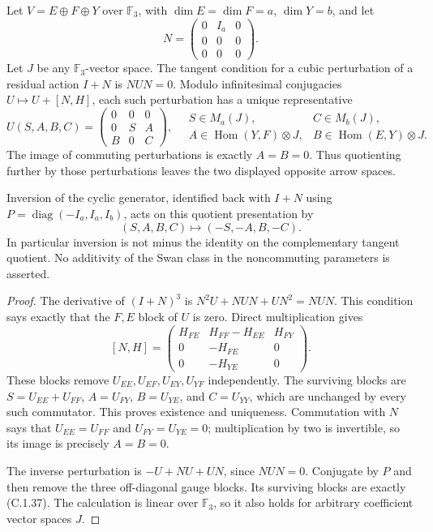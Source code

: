 \begin{lemma}
\label{C:shallow_tangent_quotient}
Let $V=E\oplus F\oplus Y$ over $\mathbb F_3$, with
$\dim E=\dim F=a$, $\dim Y=b$, and let
\[
 N=\begin{pmatrix}0&I_a&0\\0&0&0\\0&0&0\end{pmatrix}.
\]
Let $J$ be any $\mathbb F_3$-vector space. The tangent condition
for a cubic perturbation of a residual action $I+N$ is
$NUN=0$. Modulo infinitesimal conjugacies $U\mapsto U+[N,H]$,
each such perturbation has a unique representative
\[
 U(S,A,B,C)=
 \begin{pmatrix}0&0&0\\0&S&A\\B&0&C\end{pmatrix},
 \quad
 \begin{array}{ll}
 S\in M_a(J),& C\in M_b(J),\\
 A\in\operatorname{Hom}(Y,F)\otimes J,&
 B\in\operatorname{Hom}(E,Y)\otimes J.
 \end{array}                                                \tag{C.1.36}
\]
The image of commuting perturbations is exactly $A=B=0$.
Thus quotienting further by those perturbations leaves the
two displayed opposite arrow spaces.

Inversion of the cyclic generator, identified back with $I+N$
using $P=\operatorname{diag}(-I_a,I_a,I_b)$, acts on this
quotient presentation by
\[
          (S,A,B,C)\longmapsto(-S,-A,B,-C).              \tag{C.1.37}
\]
In particular inversion is not minus the identity on the
complementary tangent quotient. No additivity of the Swan
class in the noncommuting parameters is asserted.
\end{lemma}
\begin{proof}
The derivative of $(I+N)^3$ is
$N^2U+NUN+UN^2=NUN$. This condition says exactly that
the $F,E$ block of $U$ is zero. Direct multiplication gives
\[
 [N,H]=
 \begin{pmatrix}
 H_{FE}&H_{FF}-H_{EE}&H_{FY}\\
 0&-H_{FE}&0\\
 0&-H_{YE}&0
 \end{pmatrix}.
\]
These blocks remove $U_{EE},U_{EF},U_{EY},U_{YF}$ independently.
The surviving blocks are
$S=U_{EE}+U_{FF}$, $A=U_{FY}$, $B=U_{YE}$, and $C=U_{YY}$,
which are unchanged by every such commutator. This proves
existence and uniqueness. Commutation with $N$ says that
$U_{EE}=U_{FF}$ and $U_{FY}=U_{YE}=0$; multiplication by two
is invertible, so its image is precisely $A=B=0$.

The inverse perturbation is
$-U+NU+UN$, since $NUN=0$.
Conjugate by $P$ and then remove the three off-diagonal
gauge blocks. Its surviving blocks are exactly (C.1.37).
The calculation is linear over $\mathbb F_3$, so it also
holds for arbitrary coefficient vector spaces $J$.
\end{proof}

